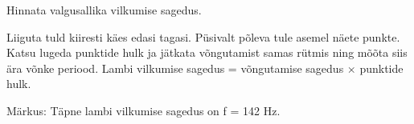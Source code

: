 
Hinnata valgusallika vilkumise sagedus.

\hint

\solu
Liiguta tuld kiiresti käes edasi tagasi. Püsivalt põleva tule asemel näete punkte. Katsu lugeda punktide hulk ja jätkata võngutamist samas rütmis ning mõõta siis ära võnke periood. Lambi vilkumise sagedus = võngutamise sagedus $\times$ punktide hulk.

Märkus: Täpne lambi vilkumise sagedus on f = 142 Hz.
\probend
